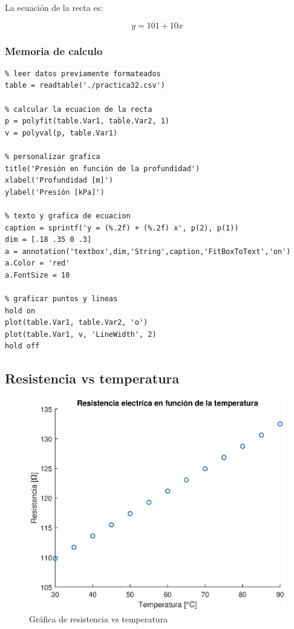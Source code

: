 \documentclass[letter,11pt]{article}
\begin{document}
La ecuación de la recta es:

\begin{equation}
    y = 101 + 10 x
\end{equation}

\subsubsection{Memoria de calculo}

\footnotesize
\begin{verbatim}
% leer datos previamente formateados
table = readtable('./practica32.csv')

% calcular la ecuacion de la recta
p = polyfit(table.Var1, table.Var2, 1)
v = polyval(p, table.Var1)

% personalizar grafica
title('Presión en función de la profundidad')
xlabel('Profundidad [m]')
ylabel('Presión [kPa]')

% texto y grafica de ecuacion
caption = sprintf('y = (%.2f) + (%.2f) x', p(2), p(1))
dim = [.18 .35 0 .3]
a = annotation('textbox',dim,'String',caption,'FitBoxToText','on')
a.Color = 'red'
a.FontSize = 10

% graficar puntos y lineas
hold on
plot(table.Var1, table.Var2, 'o')
plot(table.Var1, v, 'LineWidth', 2)
hold off
\end{verbatim}
\normalsize

\subsection{Resistencia vs temperatura}
\begin{figure}[!h]
\centering
\includegraphics[scale=1.00]{eps/practica33.eps}
\caption{Gráfica de resistencia vs temperatura}
\label{practica33}
\end{figure}
\end{document}

